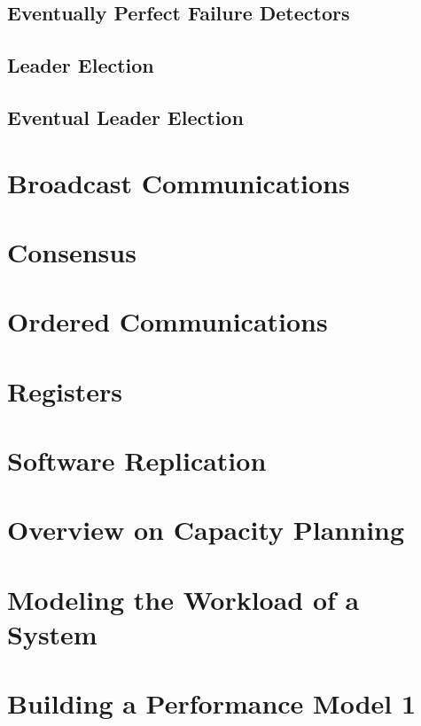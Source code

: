 \documentclass{article}
\begin{document}
	
	\subsection{Eventually Perfect Failure Detectors}
	
	\subsection{Leader Election}
	
	\subsection{Eventual Leader Election}
	
	\newpage
	\section{Broadcast Communications}
	
	\newpage
	\section{Consensus}
	
	\newpage
	\section{Ordered Communications}
	
	\newpage
	\section{Registers}
	
	\newpage
	\section{Software Replication}
	
	\newpage
	\section{Overview on Capacity Planning}
	
	\newpage
	\section{Modeling the Workload of a System}
	
	\newpage
	\section{Building a Performance Model 1}
	
\end{document}
